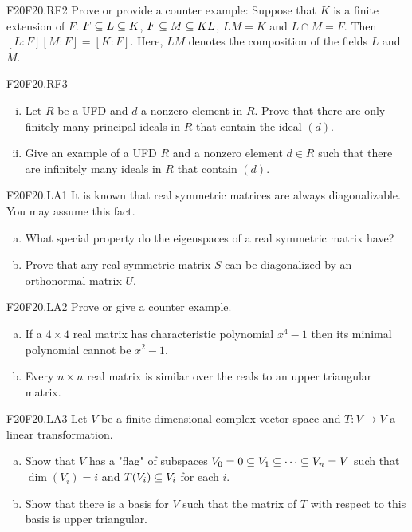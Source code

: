 \documentclass[../AlgebraQualSolutions.tex]{subfiles}
\begin{document}
	\begin{prob}{F20}{F20.RF2}
	Prove or provide a counter example: Suppose that $K$ is a finite extension of $F$. $F \subseteq L \subseteq K$, $F \subseteq M \subseteq KL$, $LM = K$ and $L \cap M = F$. Then $[L:F][M:F] = [K:F]$. Here, $LM$ denotes the composition of the fields $L$ and $M$.
	\end{prob}
	
	\begin{prob}{F20}{F20.RF3}
		\begin{enumerate}[(i)]
		\item Let $R$ be a UFD and $d$ a nonzero element in $R$. Prove that there are only finitely many principal ideals  in $R$ that contain the ideal $(d)$.
		\item Give an example of a UFD $R$ and a nonzero element $d \in R$ such that there are infinitely many ideals in $R$ that contain $(d)$.
		\end{enumerate}
	\end{prob}
	
	\begin{prob}{F20}{F20.LA1}
	It is known that real symmetric matrices are always diagonalizable. You may assume this fact.
	\begin{enumerate}[(a)]
	\item What special property do the eigenspaces of a real symmetric matrix have?
	\item Prove that any real symmetric matrix $S$ can be diagonalized by an orthonormal matrix $U$.
	\end{enumerate}
	\end{prob}
	
	\begin{prob}{F20}{F20.LA2}
	Prove or give a counter example.
	\begin{enumerate}[(a)]
	\item If a $4 \times 4$ real matrix has characteristic polynomial $x^4 -1$ then its minimal polynomial cannot be $x^2 - 1$.
	\item Every $n \times n$ real matrix is similar over the reals to an upper triangular matrix.
	\end{enumerate}
	\end{prob}
	
	\begin{prob}{F20}{F20.LA3}
	Let $V$ be a finite dimensional complex vector space and $T: V \to V$ a linear transformation.
	\begin{enumerate}[(a)]
	\item Show that $V$ has a "flag" of subspaces $V_0 = 0 \subseteq V_1 \subseteq \cdots \subseteq V_n = V$ such that $\dim(V_i) = i$ and $T(V_i) \subseteq V_i$ for each $i$.
	\item Show that there is a basis for $V$ such that the matrix of $T$ with respect to this basis is upper triangular.
	\end{enumerate}
	\end{prob}
	
\end{document}
